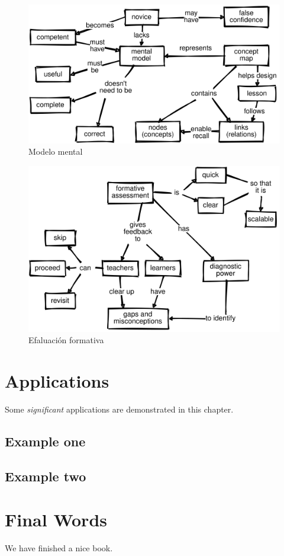 \documentclass[
]{book}
\begin{document}
\begin{figure}
\centering
\includegraphics{./img_traning/conceptmap-mental-models.svg}
\caption{Modelo mental}
\end{figure}

\begin{figure}
\centering
\includegraphics{./img_traning/conceptmap-assessment.svg}
\caption{Efaluación formativa}
\end{figure}

\hypertarget{applications}{%
\chapter{Applications}\label{applications}}

Some \emph{significant} applications are demonstrated in this chapter.

\hypertarget{example-one}{%
\section{Example one}\label{example-one}}

\hypertarget{example-two}{%
\section{Example two}\label{example-two}}

\hypertarget{final-words}{%
\chapter{Final Words}\label{final-words}}

We have finished a nice book.
\end{document}
